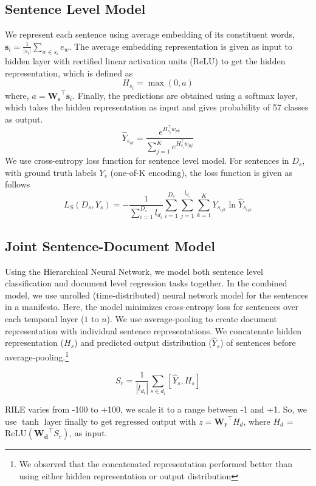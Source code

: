 \documentclass[11pt,a4paper]{article}
\begin{document}
\subsection{Sentence Level Model}
We represent each sentence using average embedding of its constituent words, $ \bm{s}_{i} = \frac{1}{|s_{i}|}\sum_{w \in s_{i}} e_{w}$.
The average embedding representation is given as input to hidden layer with rectified linear activation units (ReLU) to get the hidden representation, which is defined as 
\[H_{s_{i}}= \max(0,a)\] where, $a = \mathbf{W_{s}}^\top \bm{s}_{i}$. Finally, the predictions are obtained using a softmax layer, which takes the hidden representation as input and gives probability of 57 classes as output.
\[ \hat{Y}_{s_{ik}} = \frac{e^{H_{s_{i}}^\top w_{pk}}}{\sum_{j=1}^{K}{e^{H_{s_{i}}^\top w_{pj}}}}\]
We use cross-entropy loss function for sentence level model. For sentences in $D_{s}$, with ground truth labels $Y_{s}$ (one-of-K encoding), the loss function is given as follows
\begin{equation}
L_{S}(D_{s},Y_{s})=-\frac{1}{\sum_{i=1}^{D_{s}}l_{d_{i}}}\sum_{i=1}^{D_{s}}\sum_{j=1}^{l_{d_{i}}}\sum_{k=1}^{K} Y_{s_{ijk}} \ln \hat{Y}_{s_{ijk}}  
\end{equation}
\subsection{Joint Sentence-Document Model}
Using the Hierarchical Neural Network, we model both sentence level classification and document level regression tasks together. In the combined model, we use unrolled (time-distributed) neural network model for the sentences in a manifesto. Here, the model minimizes cross-entropy loss for sentences over each temporal layer ($1$ to $n$). We use average-pooling to create document representation with individual sentence representations. We concatenate hidden representation ($H_{s}$) and predicted output distribution ($\hat{Y}_{s}$) of sentences before average-pooling.\footnote{We observed that the concatenated representation performed better than using either hidden representation or output distribution}

\[ S_{r} = \frac{1}{|l_{d_{i}}|}\sum_{s \in d_{i}} [\hat{Y}_{s}, H_{s}] \]

RILE varies from -100 to +100, we scale it to a range between -1 and +1. So, we use $\tanh$ layer finally to get regressed output with $z = \mathbf{W_{r}}^\top H_{d}$, where $H_{d}$ = ReLU$(\mathbf{W_{d}}^\top S_{r})$, as input.
\end{document}
